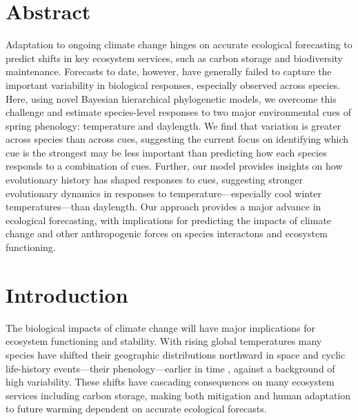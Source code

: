 \documentclass[11pt]{article}
\begin{document}
\clearpage




\section*{Abstract}
Adaptation to ongoing climate change hinges on accurate ecological forecasting to predict shifts in key ecosystem services, such as carbon storage and biodiversity maintenance. Forecasts to date, however, have generally failed to capture the important variability in biological responses, especially observed across species.  Here, using novel Bayesian hierarchical phylogenetic models, we overcome this challenge and estimate species-level responses to two major environmental cues of spring phenology: temperature and daylength. We find that variation is greater across species than across cues, suggesting the current focus on identifying which cue is the strongest may be less important than predicting how each species responds to a combination of cues. Further, our model provides insights on how evolutionary history has shaped responses to cues, suggesting stronger evolutionary dynamics in responses to temperature---especially cool winter temperatures---than daylength. Our approach provides a major advance in ecological forecasting, with implications for predicting the impacts of climate change and other anthropogenic forces on species interactons and ecosystem functioning. 
\clearpage





\section*{Introduction}
The biological impacts of climate change will have major implications for ecosystem functioning and stability. With rising global temperatures many species have shifted their geographic distributions northward in space and cyclic life-history events---their phenology---earlier in time \citep{IPCC:2014sm,parmesan2003}, against a background of high variability. These shifts have cascading consequences on many ecosystem services including carbon storage, making both mitigation and human adaptation to future warming dependent on accurate ecological forecasts. 
\end{document}
